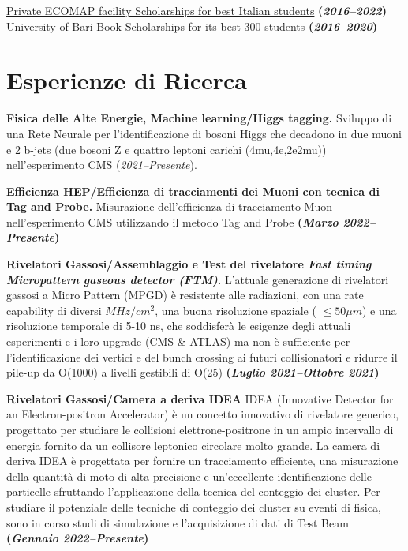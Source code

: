 \documentclass[11pt]{res}
\newcommand{\MarginText}[1]{\section{#1}\vspace{10pt}}
\begin{document}
\begin{resume}
\href{https://www.ecomap.it/news.asp?idNews=67}{Private ECOMAP facility Scholarships for best Italian students} \textbf{(\textit{2016--2022})}\\
\href{https://www.uniba.it/studenti/segreterie-studenti/amministrative/buoni-libro-per-studenti-meritevoli}{University of Bari Book Scholarships for its best 300 students} \textbf{(\textit{2016--2020})}\\

\MarginText{Esperienze di Ricerca}

\textbf{Fisica delle Alte Energie, Machine learning/Higgs tagging.} Sviluppo di una Rete Neurale per l'identificazione di bosoni Higgs che decadono in due muoni e 2 b-jets (due bosoni Z e quattro leptoni carichi (4mu,4e,2e2mu)) nell'esperimento CMS (\textit{2021--Presente}).

\textbf{Efficienza HEP/Efficienza di tracciamenti dei Muoni con tecnica di Tag and Probe.} Misurazione dell'efficienza di tracciamento Muon nell'esperimento CMS utilizzando il metodo Tag and Probe \textbf{(\textit{Marzo 2022--Presente})}

\textbf{Rivelatori Gassosi/Assemblaggio e Test del rivelatore \textit{Fast timing Micropattern gaseous detector (FTM)}.} L'attuale generazione di rivelatori gassosi a Micro Pattern (MPGD) è resistente alle radiazioni, con una rate capability di diversi $MHz/cm^{2}$, una buona risoluzione spaziale ( $\le 50\mu m$) e una risoluzione temporale di 5-10 ns, che soddisferà le esigenze degli attuali esperimenti e i loro upgrade (CMS \& ATLAS) ma non è sufficiente per l'identificazione dei vertici e del bunch crossing ai futuri collisionatori e ridurre il pile-up da O(1000) a livelli gestibili di O(25) \textbf{(\textit{Luglio 2021--Ottobre 2021})}

\textbf{Rivelatori Gassosi/Camera a deriva IDEA} IDEA (Innovative Detector for an Electron-positron Accelerator) è un concetto innovativo di rivelatore generico, progettato per studiare le collisioni elettrone-positrone in un ampio intervallo di energia fornito da un collisore leptonico circolare molto grande. La camera di deriva IDEA è progettata per fornire un tracciamento efficiente, una misurazione della quantità di moto di alta precisione e un'eccellente identificazione delle particelle sfruttando l'applicazione della tecnica del conteggio dei cluster. Per studiare il potenziale delle tecniche di conteggio dei cluster su eventi di fisica, sono in corso studi di simulazione e l'acquisizione di dati di Test Beam \textbf{(\textit{Gennaio 2022--Presente})}


\end{resume}
\end{document}
